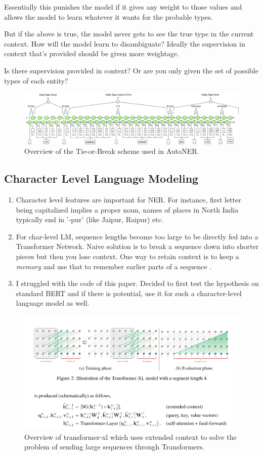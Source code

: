 Essentially this punishes the model if it gives any weight to those values and allows the model to learn whatever it wants for the probable types.

 But if the above is true, the model never gets to see the true type in the current context. How will the model learn to disambiguate? Ideally the supervision in context that's provided should be given more weightage.

 Is there supervision provided in context? Or are you only given the set of possible types of each entity?


\begin{figure}[t]
	\includegraphics[scale=0.3]{images/autoner_tie_or_break.png}
	\caption{\label{fig:tie_or_break}Overview of the Tie-or-Break scheme used in AutoNER.}
\end{figure}

\subsection{Character Level Language Modeling}
\begin{enumerate}
	\item Character level features are important for NER. For instance, first letter being capitalized implies a proper noun, names of places in North India typically end in '-pur' (like Jaipur, Raipur) etc.
	\item For char-level LM, sequence lengths become too large to be directly fed into a Transformer Network. Naive solution is to break a sequence down into shorter pieces but then you lose context. One way to retain context is to keep a \textit{memory} and use that to remember earlier parts of a sequence \cite{transformerxl}.
	\item I struggled with the code of this paper. Decided to first test the hypothesis on standard BERT and if there is potential, use it for such a character-level language model as well.
\end{enumerate}

\begin{figure}[t]
	\includegraphics[scale=0.5]{images/transformerxl}
	\caption{\label{fig:transformerxl}Overview of transformer-xl which uses extended context to solve the problem of sending large sequences through Transformers.}
\end{figure}

